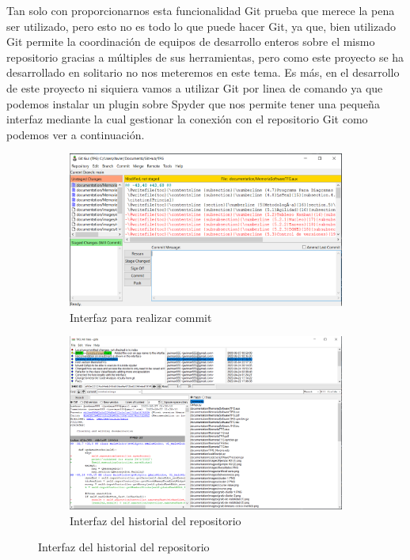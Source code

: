 \documentclass[12pt,a4paper]{article}
\begin{document}
	Tan solo con proporcionarnos esta funcionalidad Git prueba que merece la pena ser utilizado, pero esto no es todo lo que puede hacer Git, ya que, bien utilizado Git permite la coordinación de equipos de desarrollo enteros sobre el mismo repositorio gracias a múltiples de sus herramientas, pero como este proyecto se ha desarrollado en solitario no nos meteremos en este tema. Es más, en el desarrollo de este proyecto ni siquiera vamos a utilizar Git por linea de comando ya que podemos instalar un plugin sobre Spyder que nos permite tener una pequeña interfaz mediante la cual gestionar la conexión con el repositorio Git como podemos ver a continuación.\\
\begin{figure}[H]
\centering
\begin{subfigure}{.5\textwidth}
  \centering
  \includegraphics[width=.9\linewidth]{commit}
  \caption{Interfaz para realizar commit}
  \label{fig:sub1}
\end{subfigure}%
\begin{subfigure}{.5\textwidth}
  \centering
  \includegraphics[width=.9\linewidth]{interface git}
  \caption{Interfaz del historial del repositorio}
  \label{fig:sub2}
\end{subfigure}
\label{fig:test}
\end{figure}
\end{document}
